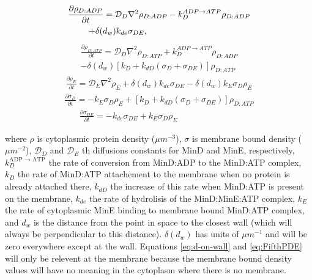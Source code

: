 \documentclass[letterpaper,twocolumn,amsmath,amssymb,pre]{revtex4-1}
\begin{document}
\begin{multline}
  \frac{\partial \rho_{D:ADP}}{\partial t} = \mathcal{D}_D\nabla^2\rho_{D:ADP}-k_D^{ADP\rightarrow ATP}\rho_{D:ADP}\\
  +\delta(d_w)k_{de}\sigma_{DE},\hspace{3.4cm}
\end{multline}
\begin{multline}
  \frac{\partial \rho_{D:ATP}}{\partial t} = \mathcal{D}_D\nabla^2\rho_{D:ATP}+k_D^{ADP\rightarrow ATP}\rho_{D:ADP}\\
  -\delta(d_w)[k_D+k_{dD}(\sigma_D+\sigma_{DE})]\rho_{D:ATP}
\end{multline}
\begin{multline}
  \frac{\partial \rho_E}{\partial t} = \mathcal{D}_E\nabla^2\rho_E+\delta(d_w)k_{de}\sigma_{DE}
  -\delta(d_w)k_E \sigma_D \rho_E
\end{multline}
\begin{multline}
  \frac{\partial \sigma_D}{\partial t} = -k_E\sigma_D\rho_E
  +[k_D+k_{dD}(\sigma_D+\sigma_{DE})]\rho_{D:ATP}
  \label{eq:d-on-wall}
\end{multline}
\begin{multline}
  \frac{\partial \sigma_{DE}}{\partial t} = -k_{de}\sigma_{DE}+k_E\sigma_D\rho_E\hspace{3cm}
  \label{eq:FifthPDE}
\end{multline}

where $\rho$ is cytoplasmic protein density ($\mu m^{-3}$), $\sigma$
is membrane bound density ($\mu m^{-2}$), $\mathcal{D}_D$ and
$\mathcal{D}_{E}$ th diffusions constants for MinD and MinE,
respectively, $k_D^{\textrm{ADP $\rightarrow$ ATP}}$ the rate of
conversion from MinD:ADP to the MinD:ATP complex, $k_D$ the rate of
MinD:ATP attachement to the membrane when no protein is already
attached there, $k_{dD}$ the increase of this rate when MinD:ATP is
present on the membrane, $k_{de}$ the rate of hydrolisis of the
MinD:MinE:ATP complex, $k_E$ the rate of cytoplasmic MinE binding to
membrane bound MinD:ATP complex, and $d_w$ is the distance from the
point in space to the closest wall (which will always be
perpendicular to this distance).  $\delta(d_w)$ has units of
$\mu m^{-1}$ and will be zero everywhere except at the wall.
Equations \ref{eq:d-on-wall} and \ref{eq:FifthPDE} will only be
relevent at the membrane because the membrane bound density values
will have no meaning in the cytoplasm where there is no membrane.
\end{document}
